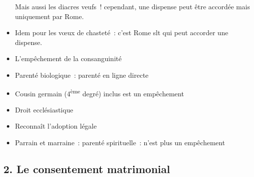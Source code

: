 \begin{itemize}
  Mais aussi les diacres veufs~! cependant, une dispense peut être
  accordée mais uniquement par Rome.
   
\item
   
  Idem pour les vœux de chasteté~: c'est Rome slt qui peut accorder une
  dispense.
   
\item
  L'empêchement de la consanguinité
\item
   
  Parenté biologique~: parenté en ligne directe
   
\item
   
  Cousin germain (4\textsuperscript{ème} degré) inclus est un
  empêchement
   
\item
   
  Droit ecclésiastique
   
\item
   
  Reconnaît l'adoption légale
   
\item
  Parrain et marraine~: parenté spirituelle~: n'est plus un empêchement
\end{itemize}

\hypertarget{le-consentement-matrimonial}{%
\subsection{2. Le consentement
matrimonial}\label{le-consentement-matrimonial}}

